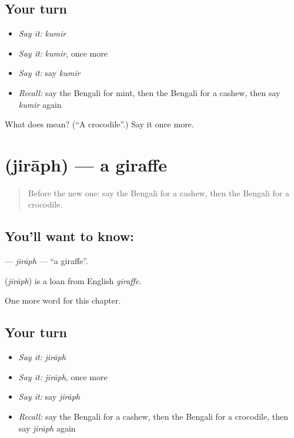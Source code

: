 \subsection*{Your turn}
\begin{itemize}
\raggedright
  \item \emph{Say it:} \emph{kumir}
  \item \emph{Say it:} \emph{kumir}, once more
  \item \emph{Say it:} say \emph{kumir}
  \item \emph{Recall:} say the Bengali for mint, then the Bengali for a cashew, then say \emph{kumir} again
\end{itemize}

\begin{tcolorbox}[breakable,colback=teal!4,colframe=teal!35!black,title={Before you move on}]
What does  mean? (\textquotedblleft{}A crocodile\textquotedblright{}.) Say it once more.
\end{tcolorbox}
\section[\texorpdfstring{\bn{জিরাফ} (jirāph)}{জিরাফ (jirāph)}]{ (jirāph) — a giraffe}

\label{lesson:BN-C250-jiraph}



\begin{quote}
Before the new one: say the Bengali for a cashew, then the Bengali for a crocodile.
\end{quote}

\subsection*{You'll want to know: }
\textbf{} — \emph{jirāph} — \textquotedblleft{}a giraffe\textquotedblright{}.

\begin{cousinweb}
\textbf{} (\emph{jirāph}) is a loan from English \emph{giraffe}.
\end{cousinweb}

\begin{grammarlens}[title={What you've built}]
One more word for this chapter.
\end{grammarlens}

\subsection*{Your turn}
\begin{itemize}
\raggedright
  \item \emph{Say it:} \emph{jirāph}
  \item \emph{Say it:} \emph{jirāph}, once more
  \item \emph{Say it:} say \emph{jirāph}
  \item \emph{Recall:} say the Bengali for a cashew, then the Bengali for a crocodile, then say \emph{jirāph} again
\end{itemize}

